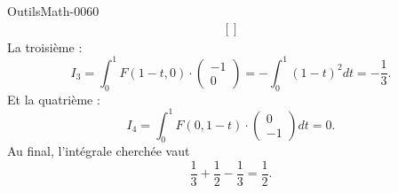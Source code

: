 \begin{corrige}{OutilsMath-0060}
\begin{equation}
\begin{aligned}[]
        \end{aligned}
    \end{equation}
    La troisième :
    \begin{equation}
        I_3=\int_0^1F(1-t,0)\cdot\begin{pmatrix}
            -1    \\ 
            0    
        \end{pmatrix}=-\int_0^1(1-t)^2dt=-\frac{1}{ 3 }.
    \end{equation}
    Et la quatrième :
    \begin{equation}
        I_4=\int_0^1 F(0,1-t)\cdot \begin{pmatrix}
            0    \\ 
            -1    
        \end{pmatrix}dt=0.
    \end{equation}
    Au final, l'intégrale cherchée vaut
    \begin{equation}
        \frac{1}{ 3 }+\frac{ 1 }{2}-\frac{1}{ 3 }=\frac{1}{ 2 }.
    \end{equation}

\end{corrige}
